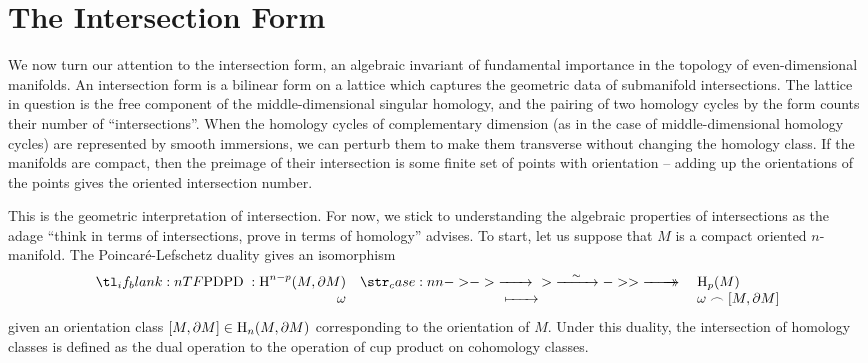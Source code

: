 \section{The Intersection Form}\label{sec:intersection-form}

We now turn our attention to the intersection form, an algebraic invariant of fundamental importance in the topology of even-dimensional manifolds. An intersection form is a bilinear form on a lattice which captures the geometric data of submanifold intersections. The lattice in question is the free component of the middle-dimensional singular homology, and the pairing of two homology cycles by the form counts their number of ``intersections''. When the homology cycles of complementary dimension (as in the case of middle-dimensional homology cycles) are represented by smooth immersions, we can perturb them to make them transverse without changing the homology class. If the manifolds are compact, then the preimage of their intersection is some finite set of points with orientation -- adding up the orientations of the points gives the oriented intersection number.

This is the geometric interpretation of intersection. For now, we stick to understanding the algebraic properties of intersections as the adage ``think in terms of intersections, prove in terms of homology'' advises. To start, let us suppose that $M$ is a compact oriented $n$-manifold.
The Poincar\'e-Lefschetz duality gives an isomorphism
\begin{equation}
	\lkxfunc{\mathrm{PD}}{\H^{n-p}(M,\partial M)}{\H_p(M)}{\omega}{\omega\frown [M,\partial M]}
\end{equation}
given an orientation class $[M,\partial M]\in \operatorname{H}_n(M, \partial M)$ corresponding to the orientation of $M$. Under this duality, the intersection of homology classes is defined as the dual operation to the operation of cup product on cohomology classes.

